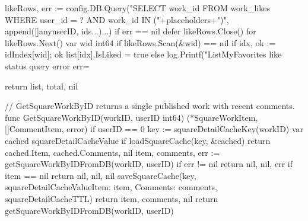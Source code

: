\documentclass[twoside]{thesis-cls-Miya} %
\begin{document}
{	likeRows, err := config.DB.Query("SELECT work_id FROM work_likes WHERE user_id = ? AND work_id IN ("+placeholders+")", append([]any{userID}, ids...)...)
	if err == nil {
		defer likeRows.Close()
		for likeRows.Next() {
			var wid int64
			if likeRows.Scan(&wid) == nil {
				if idx, ok := idIndex[wid]; ok {
					list[idx].IsLiked = true
				}
			}
		}
	} else {
		log.Printf("ListMyFavorites like status query error err=%
	}

	return list, total, nil
}

// GetSquareWorkByID returns a single published work with recent comments.
func GetSquareWorkByID(workID, userID int64) (*SquareWorkItem, []CommentItem, error) {
	if userID == 0 {
		key := squareDetailCacheKey(workID)
		var cached squareDetailCacheValue
		if loadSquareCache(key, &cached) {
			return cached.Item, cached.Comments, nil
		}
		item, comments, err := getSquareWorkByIDFromDB(workID, userID)
		if err != nil {
			return nil, nil, err
		}
		if item == nil {
			return nil, nil, nil
		}
		saveSquareCache(key, squareDetailCacheValue{Item: item, Comments: comments}, squareDetailCacheTTL)
		return item, comments, nil
	}
	return getSquareWorkByIDFromDB(workID, userID)
}
\end{document}
